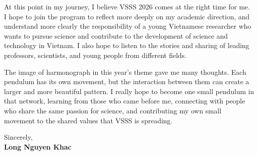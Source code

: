 \documentclass[11pt, a4paper]{src/awesome-cv}
\begin{document}
\vspace{0.18cm}

At this point in my journey,  I believe VSSS 2026 comes at the right time for me. I hope to join the program to reflect more deeply on my academic direction, and understand more clearly the responsibility of a young Vietnamese researcher who wants to pursue science and contribute to the development of science and technology in Vietnam. I also hope to listen to the stories and sharing of leading professors, scientists, and young people from different fields.
\vspace{0.18cm}

The image of harmonograph in this year’s theme gave me many thoughts. Each pendulum has its own movement, but the interaction between them can create a larger and more beautiful pattern. I really hope to become one small pendulum in that network, learning from those who came before me, connecting with people who share the same passion for science, and contributing my own small movement to the shared values that VSSS is spreading.

\vspace{0.18cm}

Sincerely,\\[0.15cm]
\textbf{Long Nguyen Khac}

\end{document}
